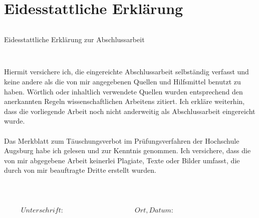 \section*{Eidesstattliche Erklärung}
\thispagestyle{empty}

\begin{verbatim}

\end{verbatim}

\begin{LARGE}
\begin{center}
	Eidesstattliche Erklärung zur Abschlussarbeit
\end{center}
\end{LARGE}
\begin{verbatim}


\end{verbatim}
Hiermit versichere ich, die eingereichte Abschlussarbeit selbständig verfasst und
keine andere als die von mir angegebenen Quellen und Hilfsmittel benutzt zu haben.
Wörtlich oder inhaltlich verwendete Quellen wurden entsprechend den anerkannten
Regeln wissenschaftlichen Arbeitens zitiert. Ich erkläre weiterhin, dass die
vorliegende Arbeit noch nicht anderweitig als Abschlussarbeit eingereicht wurde.
\\
\\
Das Merkblatt zum Täuschungsverbot im Prüfungsverfahren der Hochschule
Augsburg habe ich gelesen und zur Kenntnis genommen. Ich versichere, dass die
von mir abgegebene Arbeit keinerlei Plagiate, Texte oder Bilder umfasst, die durch
von mir beauftragte Dritte erstellt wurden.
\begin{verbatim}



\end{verbatim}


\begin{displaymath}
\begin{array}{ll}
Unterschrift:~~~~~~~~~~~~~~~~~~~~~~~~~~~~~~~~~~~~~~~~~~
& Ort, Datum:~~~~~~~~~~~~~~~~~~~~~~~~~~~~~~~~~~~~~~~~~~
\end{array}
\end{displaymath}